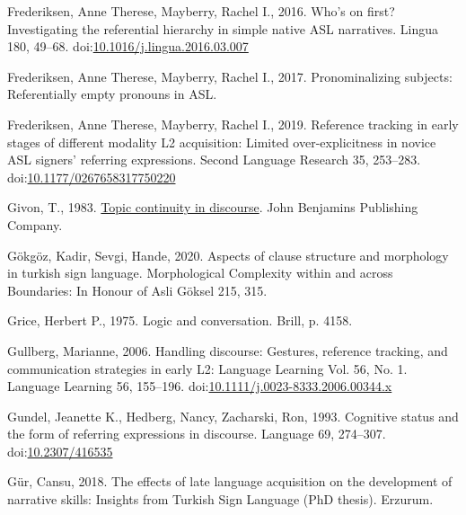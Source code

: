 \documentclass[]{elsarticle} %
\newlength{\cslhangindent}
\newenvironment{CSLReferences}[2] %
 {%
  \setlength{\parindent}{0pt}
  \ifodd #1 \everypar{\setlength{\hangindent}{\cslhangindent}}\ignorespaces\fi
  \ifnum #2 > 0
  \setlength{\parskip}{#2\baselineskip}
  \fi
 }%
 {}
\begin{document}
\begin{CSLReferences}{1}{0}
\leavevmode{}%
Frederiksen, Anne Therese, Mayberry, Rachel I., 2016. Who's on first?
Investigating the referential hierarchy in simple native ASL narratives.
Lingua 180, 49--68.
doi:\href{https://doi.org/10.1016/j.lingua.2016.03.007}{10.1016/j.lingua.2016.03.007}

\leavevmode{}%
Frederiksen, Anne Therese, Mayberry, Rachel I., 2017. Pronominalizing
subjects: Referentially empty pronouns in ASL.

\leavevmode{}%
Frederiksen, Anne Therese, Mayberry, Rachel I., 2019. Reference tracking
in early stages of different modality L2 acquisition: Limited
over-explicitness in novice ASL signers{'} referring expressions. Second
Language Research 35, 253--283.
doi:\href{https://doi.org/10.1177/0267658317750220}{10.1177/0267658317750220}

\leavevmode{}%
Givon, T., 1983. \href{https://benjamins.com/catalog/tsl.3}{Topic
continuity in discourse}. John Benjamins Publishing Company.

\leavevmode{}%
Gökgöz, Kadir, Sevgi, Hande, 2020. Aspects of clause structure and
morphology in turkish sign language. Morphological Complexity within and
across Boundaries: In Honour of Asli Göksel 215, 315.

\leavevmode{}%
Grice, Herbert P., 1975. Logic and conversation. Brill, p. 4158.

\leavevmode{}%
Gullberg, Marianne, 2006. Handling discourse: Gestures, reference
tracking, and communication strategies in early L2: Language Learning
Vol. 56, No. 1. Language Learning 56, 155--196.
doi:\href{https://doi.org/10.1111/j.0023-8333.2006.00344.x}{10.1111/j.0023-8333.2006.00344.x}

\leavevmode{}%
Gundel, Jeanette K., Hedberg, Nancy, Zacharski, Ron, 1993. Cognitive
status and the form of referring expressions in discourse. Language 69,
274--307. doi:\href{https://doi.org/10.2307/416535}{10.2307/416535}

\leavevmode{}%
Gür, Cansu, 2018. The effects of late language acquisition on the
development of narrative skills: Insights from Turkish Sign Language
(PhD thesis). Erzurum.


\end{CSLReferences}
\end{document}
